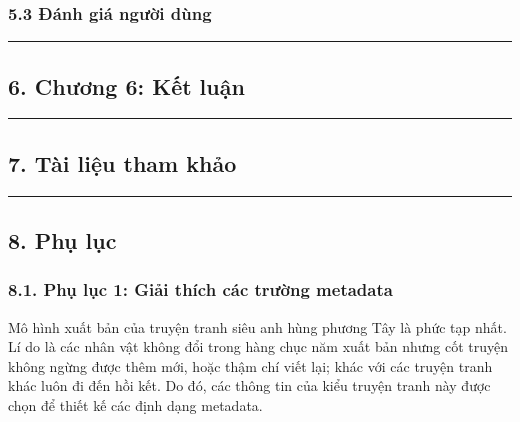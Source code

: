 \documentclass[
]{article}
\begin{document}
\hypertarget{ux111uxe1nh-giuxe1-ngux1b0ux1eddi-duxf9ng}{%
\subsubsection{\texorpdfstring{5.3 Đánh giá người dùng
}{5.3 Đánh giá người dùng }}\label{ux111uxe1nh-giuxe1-ngux1b0ux1eddi-duxf9ng}}

\begin{center}\rule{0.5\linewidth}{0.5pt}\end{center}

\hypertarget{chux1b0ux1a1ng-6-kux1ebft-luux1eadn}{%
\subsection{\texorpdfstring{6. Chương 6: Kết luận
}{6. Chương 6: Kết luận }}\label{chux1b0ux1a1ng-6-kux1ebft-luux1eadn}}

\begin{center}\rule{0.5\linewidth}{0.5pt}\end{center}

\hypertarget{tuxe0i-liux1ec7u-tham-khux1ea3o}{%
\subsection{\texorpdfstring{7. Tài liệu tham khảo
}{7. Tài liệu tham khảo }}\label{tuxe0i-liux1ec7u-tham-khux1ea3o}}

\begin{center}\rule{0.5\linewidth}{0.5pt}\end{center}

\hypertarget{phux1ee5-lux1ee5c}{%
\subsection{\texorpdfstring{8. Phụ lục
}{8. Phụ lục }}\label{phux1ee5-lux1ee5c}}

\hypertarget{phux1ee5-lux1ee5c-1-giux1ea3i-thuxedch-cuxe1c-trux1b0ux1eddng-metadata}{%
\subsubsection{\texorpdfstring{8.1. Phụ lục 1: Giải thích các trường
metadata
}{8.1. Phụ lục 1: Giải thích các trường metadata }}\label{phux1ee5-lux1ee5c-1-giux1ea3i-thuxedch-cuxe1c-trux1b0ux1eddng-metadata}}

Mô hình xuất bản của truyện tranh siêu anh hùng phương Tây là phức tạp
nhất. Lí do là các nhân vật không đổi trong hàng chục năm xuất bản nhưng
cốt truyện không ngừng được thêm mới, hoặc thậm chí viết lại; khác với
các truyện tranh khác luôn đi đến hồi kết. Do đó, các thông tin của kiểu
truyện tranh này được chọn để thiết kế các định dạng metadata.
\end{document}
